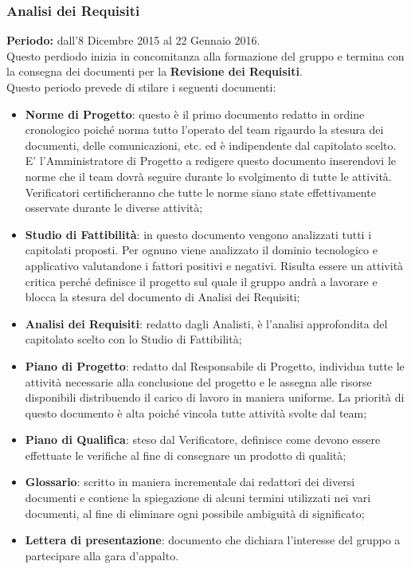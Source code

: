 \subsubsection{Analisi dei Requisiti}
\textbf{Periodo:} dall'8 Dicembre 2015 al 22 Gennaio 2016.\\
Questo perdiodo inizia in concomitanza alla formazione del gruppo e termina con la consegna dei documenti per la \textbf{Revisione dei Requisiti}.\\ 
Questo periodo prevede di stilare i seguenti documenti:
\begin{itemize}
		\item \textbf{Norme di Progetto}: questo è il primo documento redatto in ordine cronologico poiché norma tutto l'operato del team rigaurdo la stesura dei documenti, delle comunicazioni, etc. ed è indipendente dal capitolato scelto. E' l’Amministratore di Progetto a redigere questo documento inserendovi le norme che il team dovrà seguire durante lo svolgimento di tutte le attività. Verificatori certificheranno che tutte le norme siano state effettivamente osservate durante le diverse attività;
		\item \textbf{Studio di Fattibilità}: in questo documento vengono analizzati tutti i capitolati proposti. Per ognuno viene analizzato il dominio tecnologico e applicativo valutandone i fattori positivi e negativi. Risulta essere un attività	critica perché definisce il progetto sul quale il gruppo andrà a lavorare e blocca la stesura del documento di Analisi dei Requisiti;
		\item \textbf{Analisi dei Requisiti}: redatto dagli Analisti, è l'analisi approfondita del capitolato scelto con lo Studio di Fattibilità;
		\item \textbf{Piano di Progetto}: redatto dal Responsabile di Progetto, individua tutte le attività necessarie alla conclusione del progetto e le assegna alle risorse disponibili distribuendo il carico di lavoro in maniera uniforme.
		La priorità di questo documento è alta poiché vincola tutte attività svolte dal team;
		\item \textbf{Piano di Qualifica}: steso dal Verificatore, definisce come devono essere effettuate le verifiche al fine di consegnare un prodotto di qualità;
		\item \textbf{Glossario}: scritto in maniera incrementale dai redattori dei diversi documenti e contiene la spiegazione di alcuni termini utilizzati nei vari documenti, al fine di eliminare ogni possibile ambiguità di significato;
		\item \textbf{Lettera di presentazione}: documento che dichiara l’interesse del gruppo a partecipare alla gara d’appalto.
\end{itemize}
